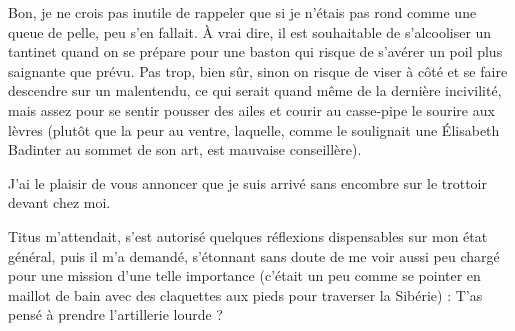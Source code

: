 %
\label{rat:23}%
Bon, je ne crois pas inutile de rappeler que si je n’étais pas rond comme une queue de pelle, peu s’en fallait. À vrai dire, il est souhaitable de s’alcooliser un tantinet quand on se prépare pour une baston qui risque de s’avérer un poil plus saignante que prévu. Pas trop, bien sûr, sinon on risque de viser à côté et se faire descendre sur un malentendu, ce qui serait quand même de la dernière incivilité, mais assez pour se sentir pousser des ailes et courir au casse-pipe le sourire aux lèvres (plutôt que la peur au ventre, laquelle, comme le soulignait une Élisabeth Badinter au sommet de son art, est mauvaise conseillère).

J’ai le plaisir de vous annoncer que je suis arrivé sans encombre sur le trottoir devant chez moi.

Titus m’attendait, s’est autorisé quelques réflexions dispensables sur mon état général, puis il m’a demandé, s’étonnant sans doute de me voir aussi peu chargé pour une mission d’une telle importance (c’était un peu comme se pointer en maillot de bain avec des claquettes aux pieds pour traverser la Sibérie) : T’as pensé à prendre l’artillerie lourde ?

